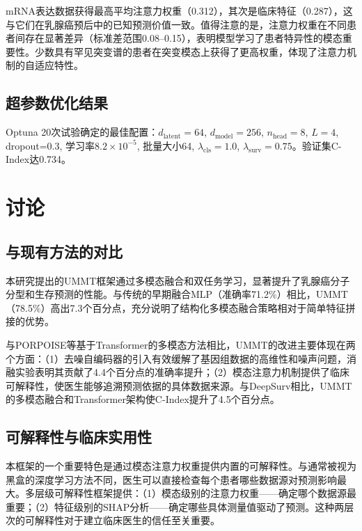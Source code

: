 \documentclass[conference]{IEEEtran}
\begin{document}
mRNA表达数据获得最高平均注意力权重（0.312），其次是临床特征（0.287），这与它们在乳腺癌预后中的已知预测价值一致。值得注意的是，注意力权重在不同患者间存在显著差异（标准差范围0.08--0.15），表明模型学习了患者特异性的模态重要性。少数具有罕见突变谱的患者在突变模态上获得了更高权重，体现了注意力机制的自适应特性。

\subsection{超参数优化结果}

Optuna 20次试验确定的最佳配置：$d_{\text{latent}}=64$, $d_{\text{model}}=256$, $n_{\text{head}}=8$, $L=4$, dropout=0.3, 学习率$8.2\times10^{-5}$, 批量大小64, $\lambda_{\text{cls}}=1.0$, $\lambda_{\text{surv}}=0.75$。验证集C-Index达0.734。

\section{讨论}
\label{sec:discussion}

\subsection{与现有方法的对比}

本研究提出的UMMT框架通过多模态融合和双任务学习，显著提升了乳腺癌分子分型和生存预测的性能。与传统的早期融合MLP（准确率71.2\%）相比，UMMT（78.5\%）高出7.3个百分点，充分说明了结构化多模态融合策略相对于简单特征拼接的优势。

与PORPOISE\cite{chen2022pan}等基于Transformer的多模态方法相比，UMMT的改进主要体现在两个方面：（1）去噪自编码器的引入有效缓解了基因组数据的高维性和噪声问题，消融实验表明其贡献了4.4个百分点的准确率提升；（2）模态注意力机制提供了临床可解释性，使医生能够追溯预测依据的具体数据来源。与DeepSurv\cite{katzman2018deepsurv}相比，UMMT的多模态融合和Transformer架构使C-Index提升了4.5个百分点。

\subsection{可解释性与临床实用性}

本框架的一个重要特色是通过模态注意力权重提供内置的可解释性。与通常被视为黑盒的深度学习方法不同，医生可以直接检查每个患者哪些数据源对预测影响最大。多层级可解释性框架提供：（1）模态级别的注意力权重——确定哪个数据源最重要；（2）特征级别的SHAP分析——确定哪些具体测量值驱动了预测。这种两层次的可解释性对于建立临床医生的信任至关重要。
\end{document}
